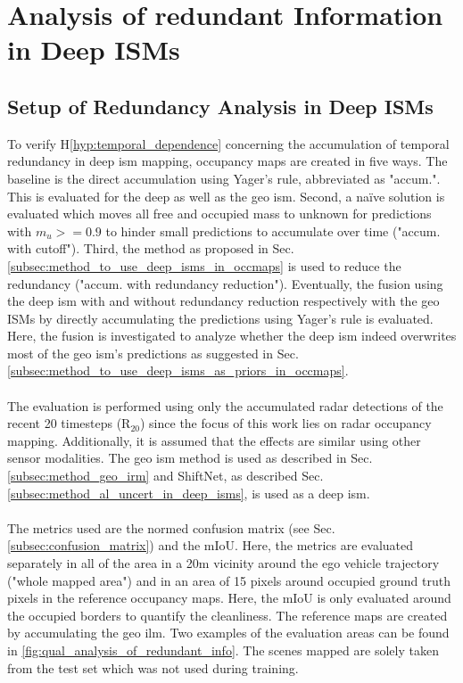 \section{Analysis of redundant Information in Deep ISMs}
\label{sec:exp_analyze_redundant_info}
%
\subsection{Setup of Redundancy Analysis in Deep ISMs}
\label{subsec:setup_of_red_analy}
To verify H\ref{hyp:temporal_dependence} concerning the accumulation of temporal redundancy in deep \gls{ism} mapping, occupancy maps are created in five ways. The baseline is the direct accumulation using Yager's rule, abbreviated as "accum.". This is evaluated for the deep as well as the geo \gls{ism}. Second, a na\"ive solution is evaluated which moves all free and occupied mass to unknown for predictions with $m_u>=0.9$ to hinder small predictions to accumulate over time ("accum. with cutoff"). Third, the method as proposed in Sec. \ref{subsec:method_to_use_deep_isms_in_occmaps} is used to reduce the redundancy ("accum. with redundancy reduction"). Eventually, the fusion using the deep \gls{ism} with and without redundancy reduction respectively with the geo ISMs by directly accumulating the predictions using Yager's rule is evaluated. Here, the fusion is investigated to analyze whether the deep \gls{ism} indeed overwrites most of the geo \gls{ism}'s predictions as suggested in Sec. \ref{subsec:method_to_use_deep_isms_as_priors_in_occmaps}.
\\\\
The evaluation is performed using only the accumulated radar detections of the recent 20 timesteps (R$_{20}$) since the focus of this work lies on radar occupancy mapping. Additionally, it is assumed that the effects are similar using other sensor modalities. The geo \gls{ism} method is used as described in Sec. \ref{subsec:method_geo_irm} and ShiftNet, as described Sec. \ref{subsec:method_al_uncert_in_deep_isms}, is used as a deep \gls{ism}.
\\\\
The metrics used are the normed confusion matrix (see Sec. \ref{subsec:confusion_matrix}) and the mIoU. Here, the metrics are evaluated separately in all of the area in a 20m vicinity around the ego vehicle trajectory ("whole mapped area") and in an area of 15 pixels around occupied ground truth pixels in the reference occupancy maps. Here, the mIoU is only evaluated around the occupied borders to quantify the cleanliness. The reference maps are created by accumulating the geo \gls{ilm}. Two examples of the evaluation areas can be found in \ref{fig:qual_analysis_of_redundant_info}. The scenes mapped are solely taken from the test set which was not used during training.
%
